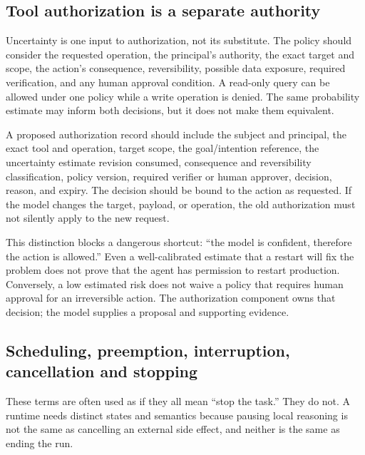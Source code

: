 \subsection{Tool authorization is a separate authority}
\label{sec:ch16-tool-authorization}

Uncertainty is one input to authorization, not its substitute. The policy should consider the requested operation, the principal's authority, the exact target and scope, the action's consequence, reversibility, possible data exposure, required verification, and any human approval condition. A read-only query can be allowed under one policy while a write operation is denied. The same probability estimate may inform both decisions, but it does not make them equivalent.

A proposed authorization record should include the subject and principal, the exact tool and operation, target scope, the goal/intention reference, the uncertainty estimate revision consumed, consequence and reversibility classification, policy version, required verifier or human approver, decision, reason, and expiry. The decision should be bound to the action as requested. If the model changes the target, payload, or operation, the old authorization must not silently apply to the new request.

This distinction blocks a dangerous shortcut: ``the model is confident, therefore the action is allowed.'' Even a well-calibrated estimate that a restart will fix the problem does not prove that the agent has permission to restart production. Conversely, a low estimated risk does not waive a policy that requires human approval for an irreversible action. The authorization component owns that decision; the model supplies a proposal and supporting evidence.


\subsection{Scheduling, preemption, interruption, cancellation and stopping}
\label{sec:ch16-interrupt-stop}

These terms are often used as if they all mean ``stop the task.'' They do not. A runtime needs distinct states and semantics because pausing local reasoning is not the same as cancelling an external side effect, and neither is the same as ending the run.

